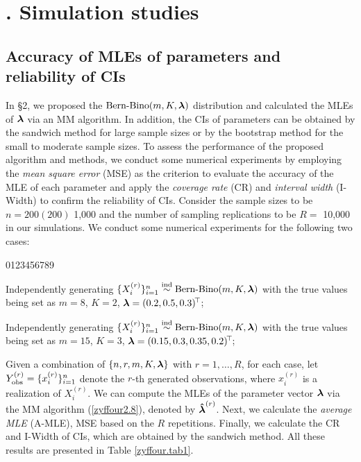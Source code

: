 \section{$\!\!\!\!\!\!\!$. Simulation studies}    %

\subsection{Accuracy of MLEs of parameters and reliability of CIs}     %

In \S 2, we proposed the $\mbox{Bern-Bino}(m, K, {\boldsymbol{\lambda}})$ distribution and calculated the MLEs of ${\boldsymbol{\lambda}}$ via an MM algorithm. In addition, the CIs of parameters can be obtained by the sandwich method for large sample sizes or by the bootstrap method for the small to moderate sample sizes. To assess the performance of the proposed algorithm and methods, we conduct some numerical experiments by employing the \textit{mean square error} (\textsf{MSE}) as the criterion to evaluate the accuracy of the MLE of each parameter and apply the \textit{coverage rate} (\textsf{CR}) and \textit{interval width} (\textsf{I-Width}) to confirm the reliability of CIs. Consider the sample sizes to be $n=200(200)$ 1,000 and the number of sampling replications to be $R = $ 10,000 in our simulations. We conduct some numerical experiments for the following two cases:
\begin{namelist}{0123456789}
\item[\hspace*{-0.05cm} Case ($\mbox{A}_1$):] Independently generating $\{X_i^{(r)}\}_{i=1}^n \stackrel{{\rm ind}}{\sim} \mbox{Bern-Bino}(m, K, {\boldsymbol{\lambda}})$ with the true values being set as $m = 8$, $K=2$, ${\boldsymbol{\lambda}} = (0.2, 0.5, 0.3)^{\!\top\!}$;

\item[\hspace*{-0.05cm} Case ($\mbox{A}_2$):] Independently generating $\{X_i^{(r)}\}_{i=1}^n \stackrel{{\rm ind}}{\sim} \mbox{Bern-Bino}(m, K, {\boldsymbol{\lambda}})$ with the true values being set as $m = 15$, $K=3$, ${\boldsymbol{\lambda}} = (0.15, 0.3, 0.35, 0.2)^{\!\top\!}$;
\end{namelist}

Given a combination of $\{n, r, m, K, {\boldsymbol{\lambda}}\}$ with $r=1, \dots, R$, for each case, let $Y_{\rm obs}^{(r)} = \{x_i^{(r)}\}_{i=1}^n$ denote the $r$-th generated observations, where $x_i^{(r)}$ is a realization of $X_i^{(r)}$. We can compute the MLEs of the parameter vector ${\boldsymbol{\lambda}}$ via the MM algorithm (\ref{zyffour2.8}), denoted by $\mbox{\boldmath${\hat \lambda}$}^{(r)}$. Next, we calculate the \textit{average MLE} (\textsf{A-MLE}), \textsf{MSE} based on the $R$ repetitions. Finally, we calculate the \textsf{CR} and \textsf{I-Width} of CIs, which are obtained by the sandwich method. All these results are presented in Table \ref{zyffour.tab1}.


